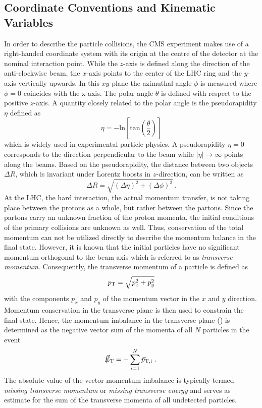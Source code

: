 \subsection{Coordinate Conventions and Kinematic Variables}
\label{subsec:cms_coordinates}
In order to describe the particle collisions, the CMS experiment makes use of a right-handed coordinate system with its origin at the centre of the detector at the nominal interaction point. While the $z$-axis is defined along the direction of the anti-clockwise beam, the $x$-axis points to the center of the LHC ring and the $y$-axis vertically upwards. In this $xy$-plane the azimuthal angle $\phi$ is measured where $\phi = 0$ coincides with the x-axis. The polar angle $\theta$ is defined with respect to the positive $z$-axis. A quantity closely related to the polar angle is the pseudorapidity $\eta$ defined as
\begin{equation}
\eta = \mathrm{-ln} \left[\mathrm{tan} \left(\frac{\theta}{2} \right)\right]
\end{equation}
which is widely used in experimental particle physics. A pseudorapidity $\eta = 0$ corresponds to the direction perpendicular to the beam while $|\eta| \rightarrow \infty$ points along the beams. Based on the pseudorapidity, the distance between two objects $\Delta R$, which is invariant under Lorentz boosts in $z$-direction, can be written as
\begin{equation}
\Delta R = \sqrt{(\Delta \eta)^2 + (\Delta \phi)^2} \, .
\end{equation}
At the LHC, the hard interaction, \ie the actual momentum transfer, is not taking place between the protons as a whole, but rather between the partons. Since the partons carry an unknown fraction of the proton momenta, the initial conditions of the primary collisions are unknown as well. Thus, conservation of the total momentum can not be utilized directly to describe the momentum balance in the final state. However, it is known that the initial particles have no significant momentum orthogonal to the beam axis which is referred to as \textit{transverse momentum}. Consequently, the transverse momentum of a particle is defined as 
\begin{equation}
p_{\text{T}} = \sqrt{p_x^2 + p_y^2} 
\end{equation}
with the components $p_x$ and $p_y$ of the momentum vector in the $x$ and $y$ direction. Momentum conservation in the transverse plane is then used to constrain the final state. Hence, the momentum imbalance in the transverse plane (\metvec) is determined as the negative vector sum of the momenta of all $N$ particles in the event
\begin{equation}
\slash\mkern-12mu{\vec{E}}_{\text{T}} = - \sum_{i=1}^{N} \vec{p}_\mathrm{T,i} \; .
\end{equation}
The absolute value of the vector momentum imbalance \met is typically termed \textit{missing transverse momentum} or \textit{missing transverse energy} and serves as estimate for the sum of the transverse momenta of all undetected particles.

